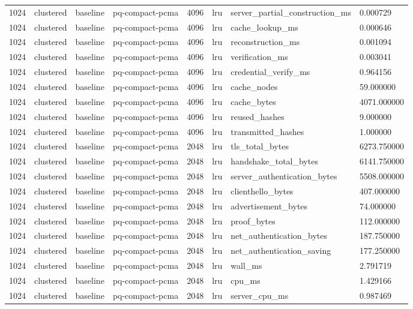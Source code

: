 \begin{tabular}{llllllll}
1024 & clustered & baseline & pq-compact-pcma & 4096 & lru & server\_partial\_construction\_ms & 0.000729 \\
1024 & clustered & baseline & pq-compact-pcma & 4096 & lru & cache\_lookup\_ms & 0.000646 \\
1024 & clustered & baseline & pq-compact-pcma & 4096 & lru & reconstruction\_ms & 0.001094 \\
1024 & clustered & baseline & pq-compact-pcma & 4096 & lru & verification\_ms & 0.003041 \\
1024 & clustered & baseline & pq-compact-pcma & 4096 & lru & credential\_verify\_ms & 0.964156 \\
1024 & clustered & baseline & pq-compact-pcma & 4096 & lru & cache\_nodes & 59.000000 \\
1024 & clustered & baseline & pq-compact-pcma & 4096 & lru & cache\_bytes & 4071.000000 \\
1024 & clustered & baseline & pq-compact-pcma & 4096 & lru & reused\_hashes & 9.000000 \\
1024 & clustered & baseline & pq-compact-pcma & 4096 & lru & transmitted\_hashes & 1.000000 \\
1024 & clustered & baseline & pq-compact-pcma & 2048 & lru & tls\_total\_bytes & 6273.750000 \\
1024 & clustered & baseline & pq-compact-pcma & 2048 & lru & handshake\_total\_bytes & 6141.750000 \\
1024 & clustered & baseline & pq-compact-pcma & 2048 & lru & server\_authentication\_bytes & 5508.000000 \\
1024 & clustered & baseline & pq-compact-pcma & 2048 & lru & clienthello\_bytes & 407.000000 \\
1024 & clustered & baseline & pq-compact-pcma & 2048 & lru & advertisement\_bytes & 74.000000 \\
1024 & clustered & baseline & pq-compact-pcma & 2048 & lru & proof\_bytes & 112.000000 \\
1024 & clustered & baseline & pq-compact-pcma & 2048 & lru & net\_authentication\_bytes & 187.750000 \\
1024 & clustered & baseline & pq-compact-pcma & 2048 & lru & net\_authentication\_saving & 177.250000 \\
1024 & clustered & baseline & pq-compact-pcma & 2048 & lru & wall\_ms & 2.791719 \\
1024 & clustered & baseline & pq-compact-pcma & 2048 & lru & cpu\_ms & 1.429166 \\
1024 & clustered & baseline & pq-compact-pcma & 2048 & lru & server\_cpu\_ms & 0.987469 \\

\end{tabular}

